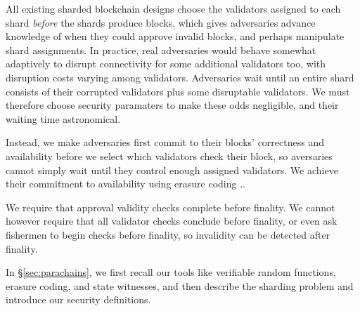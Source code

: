 


All existing sharded blockchain designs choose the validators assigned to each shard {\em before} the shards produce blocks, which gives adversaries advance knowledge of when they could approve invalid blocks, and perhaps manipulate shard assignments.  In practice, real adversaries would behave somewhat adaptively to disrupt connectivity for some additional validators too, with disruption costs varying among validators.  
Adversaries wait until an entire shard consists of their corrupted validators plus some disruptable validators.  We must therefore choose security paramaters to make these odds negligible, and their waiting time astronomical.

Instead, we make adversaries first commit to their blocks' correctness and availability before we select which validators check their block, so aversaries cannot simply wait until they control enough assigned validators.  We achieve their commitment to availability using erasure coding ..











We require that approval validity checks complete before finality.  We cannot however require that all validator checks conclude before finality, or even ask fishermen to begin checks before finality, so invalidity can be detected after finality.


In \S\ref{sec:parachains}, we first recall our tools like verifiable random functions, erasure coding, and state witnesses, and then describe the sharding problem and introduce our security definitions. 

